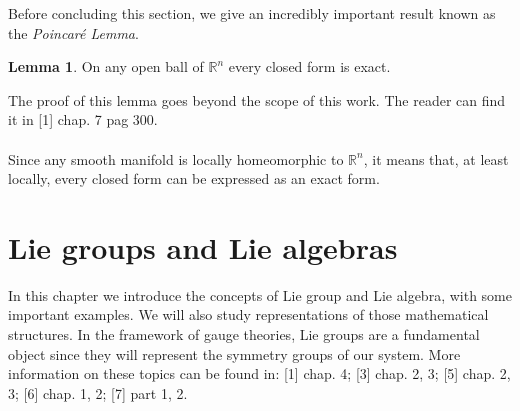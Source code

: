 \documentclass[12pt,a4paper]{report}
\theoremstyle{definition}
\theoremstyle{Theorem}
\newtheorem{Lm}[Def]{Lemma}
\theoremstyle{definition}
\theoremstyle{definition}
\begin{document}
	Before concluding this section, we give an incredibly important result known as the \textit{Poincaré Lemma}.
	\begin{Lm}\label{P.L.}
		On any open ball of $\mathbb{R}^n$ every closed form is exact.
	\end{Lm}
	The proof of this lemma goes beyond the scope of this work. The reader can find it in [1] chap. 7 pag 300.\\
	\\
	Since any smooth manifold is locally homeomorphic to $\mathbb{R}^n$, it means that, at least locally, every closed form can be expressed as an exact form.
	\chapter{Lie groups and Lie algebras}
	In this chapter we introduce the concepts of Lie group and Lie algebra, with some important examples. We will also study representations of those mathematical structures. In the framework of gauge theories, Lie groups are a fundamental object since they will represent the symmetry groups of our system. More information on these topics can be found in:
	[1] chap. 4; [3] chap. 2, 3; [5] chap. 2, 3; [6] chap. 1, 2; [7] part 1, 2.
\end{document}
